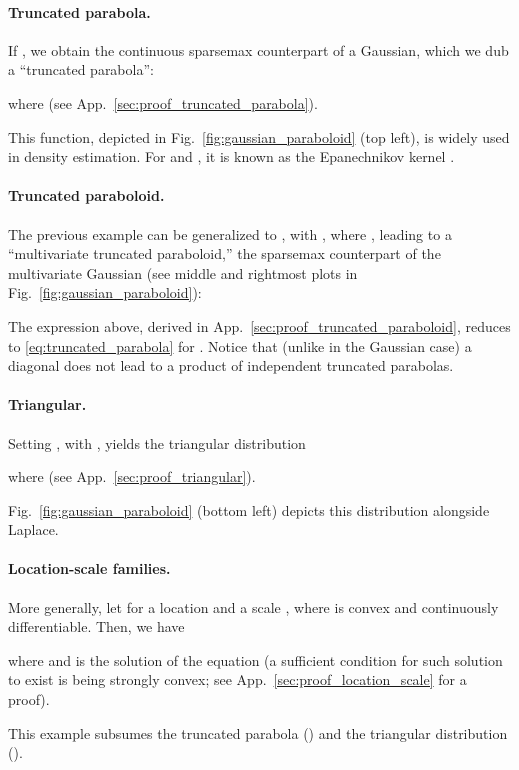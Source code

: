 \documentclass{article}
\newcommand{\remove}[1]{}
\begin{document}
\paragraph{Truncated parabola.} 
If , we obtain the continuous sparsemax counterpart of a Gaussian, which we dub a ``truncated parabola'':

where  (see App.~\ref{sec:proof_truncated_parabola}). 
\remove{
, 
 and .
}
This function, depicted in Fig.~\ref{fig:gaussian_paraboloid} (top left), is widely used in density estimation. For  and , it is known as the Epanechnikov kernel \citep{epanechnikov1969non}.


\paragraph{Truncated paraboloid.} 
The previous example can be generalized to , with , where , leading to a ``multivariate truncated paraboloid,'' the sparsemax counterpart of the multivariate Gaussian (see middle and rightmost plots in Fig.~\ref{fig:gaussian_paraboloid}):

The expression above, derived in App.~\ref{sec:proof_truncated_paraboloid}, reduces to \eqref{eq:truncated_parabola} for .
Notice that (unlike in the Gaussian case) a diagonal  does not lead to a product of independent truncated parabolas.


\paragraph{Triangular.} 
Setting , with ,  yields the triangular distribution 

where  (see App.~\ref{sec:proof_triangular}). 
\remove{
, and 
}
Fig.~\ref{fig:gaussian_paraboloid} (bottom left) depicts this distribution alongside Laplace.





\paragraph{Location-scale families.} 
More generally, let
 for a location   and a scale  , where
 is convex and continuously differentiable.
Then, we have

where 
and  is the solution of the equation  (a sufficient condition for such solution to exist is  being strongly convex; see App.~\ref{sec:proof_location_scale} for a proof).  
\remove{
The support of this distribution is
. 
}
This example subsumes the truncated parabola () and the triangular distribution (). 
\end{document}
